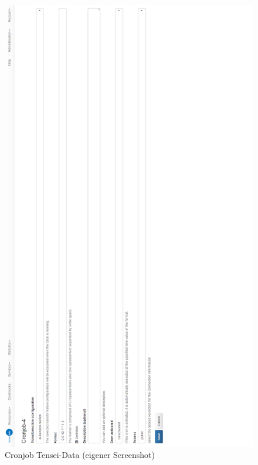 \begin{figure}[ht]
	\begin{center}
		\includegraphics[scale=0.3]{bilder/cronjob.png}
		\caption{Cronjob Tensei-Data (eigener Screenshot)}
		\label{pic:cronjob:Tensei}
	\end{center}
\end{figure}

